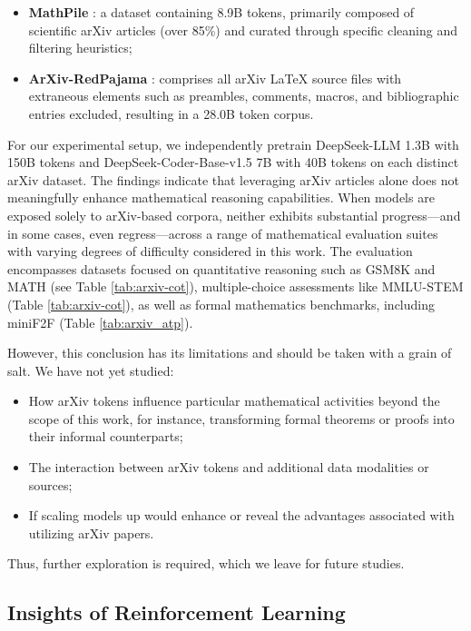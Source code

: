 \begin{itemize}[topsep=0pt]
\begin{itemize}[topsep=0pt]
\begin{itemize}[topsep=0pt]
    \item \textbf{MathPile} \citep{mathpile}: a dataset containing 8.9B tokens, primarily composed of scientific arXiv articles (over 85\%) and curated through specific cleaning and filtering heuristics;
    \item \textbf{ArXiv-RedPajama} \citep{redpajama}: comprises all arXiv LaTeX source files with extraneous elements such as preambles, comments, macros, and bibliographic entries excluded, resulting in a 28.0B token corpus.
\end{itemize}

For our experimental setup, we independently pretrain DeepSeek-LLM 1.3B with 150B tokens and DeepSeek-Coder-Base-v1.5 7B with 40B tokens on each distinct arXiv dataset. The findings indicate that leveraging arXiv articles alone does not meaningfully enhance mathematical reasoning capabilities. When models are exposed solely to arXiv-based corpora, neither exhibits substantial progress—and in some cases, even regress—across a range of mathematical evaluation suites with varying degrees of difficulty considered in this work. The evaluation encompasses datasets focused on quantitative reasoning such as GSM8K and MATH (see Table \ref{tab:arxiv-cot}), multiple-choice assessments like MMLU-STEM (Table \ref{tab:arxiv-cot}), as well as formal mathematics benchmarks, including miniF2F (Table \ref{tab:arxiv_atp}).

However, this conclusion has its limitations and should be taken with a grain of salt. We have not yet studied:

\begin{itemize}[topsep=0pt]
    \item How arXiv tokens influence particular mathematical activities beyond the scope of this work, for instance, transforming formal theorems or proofs into their informal counterparts;
    \item The interaction between arXiv tokens and additional data modalities or sources;
    \item If scaling models up would enhance or reveal the advantages associated with utilizing arXiv papers.
\end{itemize}

Thus, further exploration is required, which we leave for future studies.

\subsection{Insights of Reinforcement Learning}

\end{itemize}
\end{itemize}

